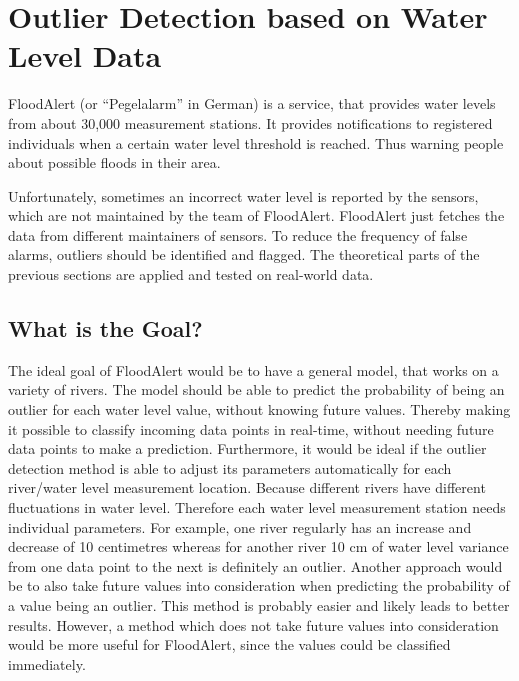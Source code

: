 \chapter{Outlier Detection based on Water Level Data}
FloodAlert (or ``Pegelalarm'' in German) is a service, that provides water levels from about 30,000 measurement stations. It provides notifications to registered individuals when a certain water level threshold is reached. Thus warning people about possible floods in their area. \cite{strassmayrFloodAlertWaterLevels}


Unfortunately, sometimes an incorrect water level is reported by the sensors, which are not maintained by the team of FloodAlert. FloodAlert just fetches the data from different maintainers of sensors. To reduce the frequency of false alarms, outliers should be identified and flagged. The theoretical parts of the previous sections are applied and tested on real-world data.
\section{What is the Goal?}
The ideal goal of FloodAlert would be to have a general model, that works on a variety of rivers. The model should be able to predict the probability of being an outlier for each water level value, without knowing future values. Thereby making it possible to classify incoming data points in real-time, without needing future data points to make a prediction. Furthermore, it would be ideal if the outlier detection method is able to adjust its parameters automatically for each river/water level measurement location. Because different rivers have different fluctuations in water level. Therefore each water level measurement station needs individual parameters. For example, one river regularly has an increase and decrease of 10 centimetres whereas for another river 10 cm of water level variance from one data point to the next is definitely an outlier.
\newline
\newline
Another approach would be to also take future values into consideration when predicting the probability of a value being an outlier. This method is probably easier and likely leads to better results. However, a method which does not take future values into consideration would be more useful for FloodAlert, since the values could be classified immediately.

